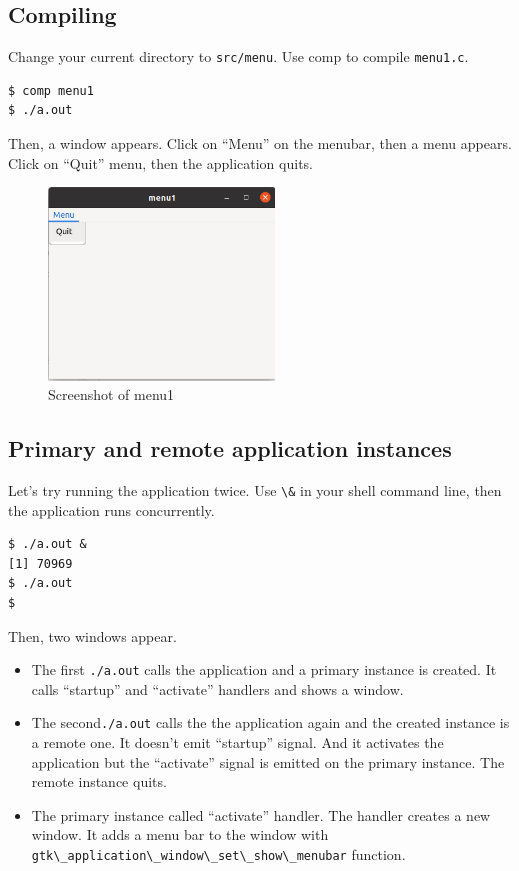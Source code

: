 \subsection{Compiling}\label{compiling}

Change your current directory to \passthrough{\lstinline!src/menu!}. Use
comp to compile \passthrough{\lstinline!menu1.c!}.

\begin{lstlisting}
$ comp menu1
$ ./a.out
\end{lstlisting}

Then, a window appears. Click on ``Menu'' on the menubar, then a menu
appears. Click on ``Quit'' menu, then the application quits.

\begin{figure}
\centering
\includegraphics[width=6cm,height=5.115cm]{../image/menu1_screenshot.png}
\caption{Screenshot of menu1}
\end{figure}

\subsection{Primary and remote application
instances}\label{primary-and-remote-application-instances}

Let's try running the application twice. Use
\passthrough{\lstinline!\&!} in your shell command line, then the
application runs concurrently.

\begin{lstlisting}
$ ./a.out &
[1] 70969
$ ./a.out
$ 
\end{lstlisting}

Then, two windows appear.

\begin{itemize}
\tightlist
\item
  The first \passthrough{\lstinline!./a.out!} calls the application and
  a primary instance is created. It calls ``startup'' and ``activate''
  handlers and shows a window.
\item
  The second\passthrough{\lstinline!./a.out!} calls the the application
  again and the created instance is a remote one. It doesn't emit
  ``startup'' signal. And it activates the application but the
  ``activate'' signal is emitted on the primary instance. The remote
  instance quits.
\item
  The primary instance called ``activate'' handler. The handler creates
  a new window. It adds a menu bar to the window with
  \passthrough{\lstinline!gtk\_application\_window\_set\_show\_menubar!}
  function.
\end{itemize}

